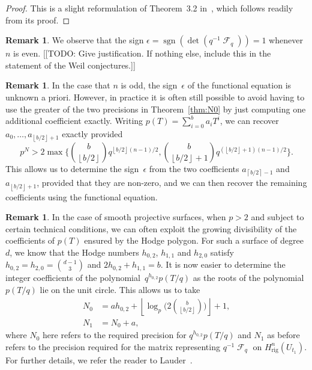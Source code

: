 \documentclass[a4paper,11pt]{article}
\numberwithin{equation}{section}
\providecommand{\floor}[1]{\left\lfloor#1\right\rfloor}   %
\providecommand{\ceil}[1]{\left\lceil#1\right\rceil}   %
\DeclareMathOperator{\sgn}{sgn}          %
\DeclareMathOperator{\Frob}{\mathcal{F}} %
\providecommand{\Hrig}{H_{\text{rig}}}  %
\theoremstyle{definition}
\newtheorem{rem}[thm]{Remark}
\begin{document}
\begin{proof}
This is a slight reformulation of {Theorem~3.2} in~\citep{Gerkmann2007}, 
which follows readily from its proof.
\end{proof}

\begin{rem}
We observe that the sign $\epsilon = \sgn(\det(q^{-1} \Frob_q)) = 1$ 
whenever $n$ is even.  [[TODO: Give justification.  If nothing else, 
include this in the statement of the Weil conjectures.]]
\end{rem}

\begin{rem}
In the case that $n$ is odd, the sign~$\epsilon$ of the functional 
equation is unknown a priori.  However, in practice it is often still 
possible to avoid having to use the greater of the two precisions in 
Theorem~\ref{thm:N0} by just computing one additional coefficient 
exactly.  Writing $p(T) = \sum_{i=0}^{b} a_i T^i$, we can recover 
$a_0, \dotsc, a_{\floor{b/2}+1}$ exactly provided 
\begin{equation}
p^N > 2 \max\biggl\{\binom{b}{\floor{b/2}} q^{\floor{b/2} (n-1) / 2}, 
                   \binom{b}{\floor{b/2}+1} q^{(\floor{b/2}+1) (n-1)/2} \biggr\}.
\end{equation}
This allows us to determine the sign~$\epsilon$ from the two 
coefficients $a_{\ceil{b/2}-1}$ and $a_{\floor{b/2}+1}$, provided 
that they are non-zero, and we can then recover the remaining 
coefficients using the functional equation.
\end{rem}

\begin{rem} \label{rem:N0Surfaces}
In the case of smooth projective surfaces, when $p > 2$ and subject to 
certain technical conditions, we can often exploit the growing divisibility 
of the coefficients of $p(T)$ ensured by the Hodge polygon.  For such a surface 
of degree~$d$, we know that the Hodge numbers $h_{0,2}$, $h_{1,1}$ and $h_{2,0}$ 
satisfy $h_{0,2} = h_{2,0} = \binom{d-1}{3}$ and $2 h_{0,2} + h_{1,1} = b$. 
It is now easier to determine the integer coefficients of the 
polynomial~$q^{h_{0,2}} p(T/q)$ as the roots of the polynomial $p(T/q)$ lie 
on the unit circle.  This allows us to take 
\begin{align*}
N_0 & = a h_{0,2} + \floor{\log_p \biggl( 2 \binom{b}{\floor{b/2}}\biggr)} + 1,\\
N_1 & = N_0 + a,
\end{align*}
where $N_0$ here refers to the required precision for $q^{h_{0,2}} p(T/q)$ 
and $N_1$ as before refers to the precision required for the matrix 
representing $q^{-1} \Frob_q$ on $\Hrig^{n}(U_{t_1})$.
For further details, we refer the reader to 
Lauder~\citep[\S 9.3.2, Proposition~9.6]{Lauder2006}.
\end{rem}
\end{document}
